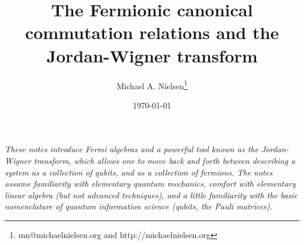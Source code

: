 \documentclass[12pt]{article}
\begin{document}
\title{The Fermionic canonical commutation relations and the
  Jordan-Wigner transform} 

\author{Michael A. Nielsen\thanks{mn@michaelnielsen.org and
    http://michaelnielsen.org} }

\date{\today}

\maketitle

\emph{These notes introduce Fermi algebras and a powerful tool known
  as the Jordan-Wigner transform, which allows one to move back and
  forth between describing a system as a collection of qubits, and as
  a collection of fermions.  The notes assume familiarity with
  elementary quantum mechanics, comfort with elementary linear algebra
  (but not advanced techniques), and a little familiarity with the
  basic nomenclature of quantum information science (qubits, the Pauli
  matrices).}
\end{document}
